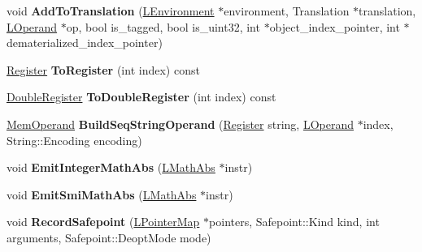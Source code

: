 \begin{DoxyCompactItemize}
\item 
void {\bfseries Add\+To\+Translation} (\hyperlink{classv8_1_1internal_1_1_l_environment}{L\+Environment} $\ast$environment, Translation $\ast$translation, \hyperlink{classv8_1_1internal_1_1_l_operand}{L\+Operand} $\ast$op, bool is\+\_\+tagged, bool is\+\_\+uint32, int $\ast$object\+\_\+index\+\_\+pointer, int $\ast$dematerialized\+\_\+index\+\_\+pointer)\hypertarget{classv8_1_1internal_1_1_l_code_gen_a418f466c19b6671a29663f4378a36d8c}{}\label{classv8_1_1internal_1_1_l_code_gen_a418f466c19b6671a29663f4378a36d8c}

\item 
\hyperlink{structv8_1_1internal_1_1_register}{Register} {\bfseries To\+Register} (int index) const \hypertarget{classv8_1_1internal_1_1_l_code_gen_ae4d98c4f4146a2d8ea844342a5bae0ea}{}\label{classv8_1_1internal_1_1_l_code_gen_ae4d98c4f4146a2d8ea844342a5bae0ea}

\item 
\hyperlink{structv8_1_1internal_1_1_double_register}{Double\+Register} {\bfseries To\+Double\+Register} (int index) const \hypertarget{classv8_1_1internal_1_1_l_code_gen_a371876b861c4031096e632a0af70b549}{}\label{classv8_1_1internal_1_1_l_code_gen_a371876b861c4031096e632a0af70b549}

\item 
\hyperlink{classv8_1_1internal_1_1_mem_operand}{Mem\+Operand} {\bfseries Build\+Seq\+String\+Operand} (\hyperlink{structv8_1_1internal_1_1_register}{Register} string, \hyperlink{classv8_1_1internal_1_1_l_operand}{L\+Operand} $\ast$index, String\+::\+Encoding encoding)\hypertarget{classv8_1_1internal_1_1_l_code_gen_a20aee7187252d655324a448e52b821d2}{}\label{classv8_1_1internal_1_1_l_code_gen_a20aee7187252d655324a448e52b821d2}

\item 
void {\bfseries Emit\+Integer\+Math\+Abs} (\hyperlink{classv8_1_1internal_1_1_l_math_abs}{L\+Math\+Abs} $\ast$instr)\hypertarget{classv8_1_1internal_1_1_l_code_gen_a47f49c0b36ce0adea0f302d6d3e44716}{}\label{classv8_1_1internal_1_1_l_code_gen_a47f49c0b36ce0adea0f302d6d3e44716}

\item 
void {\bfseries Emit\+Smi\+Math\+Abs} (\hyperlink{classv8_1_1internal_1_1_l_math_abs}{L\+Math\+Abs} $\ast$instr)\hypertarget{classv8_1_1internal_1_1_l_code_gen_afe785346e42959a185e1f17d3620c595}{}\label{classv8_1_1internal_1_1_l_code_gen_afe785346e42959a185e1f17d3620c595}

\item 
void {\bfseries Record\+Safepoint} (\hyperlink{classv8_1_1internal_1_1_l_pointer_map}{L\+Pointer\+Map} $\ast$pointers, Safepoint\+::\+Kind kind, int arguments, Safepoint\+::\+Deopt\+Mode mode)\hypertarget{classv8_1_1internal_1_1_l_code_gen_a5c5e6c0360111f74e6c274c456c70b74}{}\label{classv8_1_1internal_1_1_l_code_gen_a5c5e6c0360111f74e6c274c456c70b74}


\end{DoxyCompactItemize}
